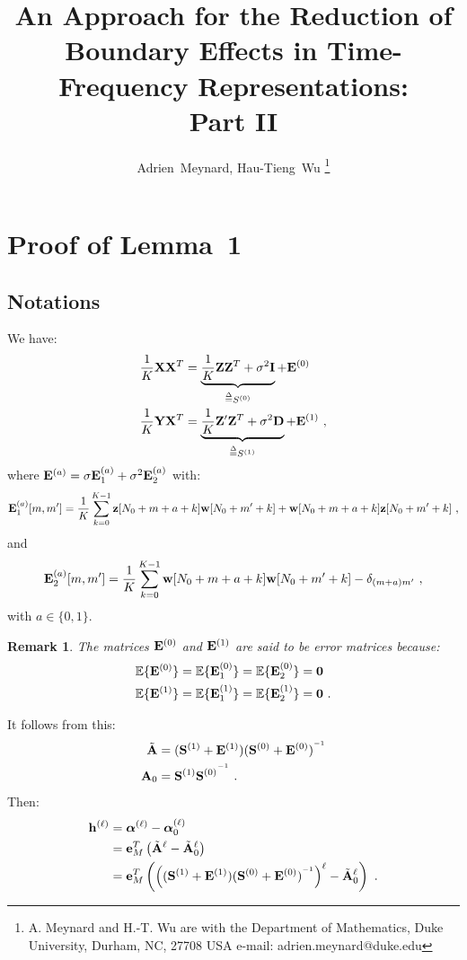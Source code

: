 \documentclass[journal, onecolumn]{IEEEtran}
\title{An Approach for the Reduction of Boundary Effects in Time-Frequency Representations:\\ Part II}
\author{Adrien~Meynard, %
        Hau-Tieng~Wu
\thanks{A. Meynard and H.-T. Wu are with the Department
of Mathematics, Duke University, Durham,
NC, 27708 USA e-mail: adrien.meynard@duke.edu}}
\newtheorem{remark}{Remark}
\begin{document}
\maketitle

\setcounter{equation}{8}
\setcounter{figure}{3}


\section{Proof of Lemma~1}
\label{ap:lm.error}

\subsection{Notations}
We have:
\begin{align}
\dfrac1K{\mathbf X}{\mathbf X}^T &= \underbrace{\dfrac1K{\mathbf Z}{\mathbf Z}^T+\sigma^2{\mathbf I}}_{\overset{\Delta}{=} S^{(0)}} + {\mathbf E}^{(0)} \\
\dfrac1K{\mathbf Y}{\mathbf X}^T &= \underbrace{\dfrac1K{\mathbf Z}'{\mathbf Z}^T +\sigma^2{\mathbf D}}_{\overset{\Delta}{=} S^{(1)}}+ {\mathbf E}^{(1)} \ ,
\end{align}
where ${\mathbf E}^{(a)} = \sigma{\mathbf E}_1^{(a)} + \sigma^2{\mathbf E}_2^{(a)}$ with:
\[
{\mathbf E}_1^{(a)}[m,m'] = \dfrac1K\sum_{k=0}^{K-1} {\mathbf z}[N_0+m+a+k]{\mathbf w}[N_0+m'+k] + {\mathbf w}[N_0+m+a+k]{\mathbf z}[N_0+m'+k]\ ,
\]
and
\[
{\mathbf E}_2^{(a)}[m,m'] =  \dfrac1K\sum_{k=0}^{K-1} {\mathbf w}[N_0+m+a+k]{\mathbf w}[N_0+m'+k] - \delta_{(m+a)m'}\ ,
\]
with $a\in\{0,1\}$.

\begin{remark}
The matrices ${\mathbf E}^{(0)}$ and ${\mathbf E}^{(1)}$ are said to be error matrices because:
\begin{align*}
{\mathbb E}\{{\mathbf E}^{(0)}\} &= {\mathbb E}\{{\mathbf E}_1^{(0)}\} = {\mathbb E}\{{\mathbf E}_2^{(0)}\} = \boldsymbol{0} \\
{\mathbb E}\{{\mathbf E}^{(1)}\} &= {\mathbb E}\{{\mathbf E}_1^{(1)}\} = {\mathbb E}\{{\mathbf E}_2^{(1)}\} = \boldsymbol{0}\ .
\end{align*}
\end{remark}

It follows from this:
\begin{align*}
\tilde{{\mathbf A}} &= ({\mathbf S}^{(1)}+{\mathbf E}^{(1)})({\mathbf S}^{(0)}+{\mathbf E}^{(0)})^{^{-1}} \\
{\mathbf A}_0 &={\mathbf S}^{(1)}{{\mathbf S}^{(0)}}^{^{-1}}\ .
\end{align*}
Then:
\begin{align}
\nonumber
\bh^{(\ell)} &= \balpha^{(\ell)} - \balpha^{(\ell)}_0 \\
\nonumber
&= \be_M^T\left(\tilde\bA^\ell-\tilde\bA_0^\ell\right) \\
&= \be_M^T\left(\left((\bS^{(1)}+\bE^{(1)})(\bS^{(0)}+\bE^{(0)})^\inv\right)^\ell- \tilde\bA_0^\ell\right)\ .
\label{eq:error.vec}
\end{align}
\end{document}
